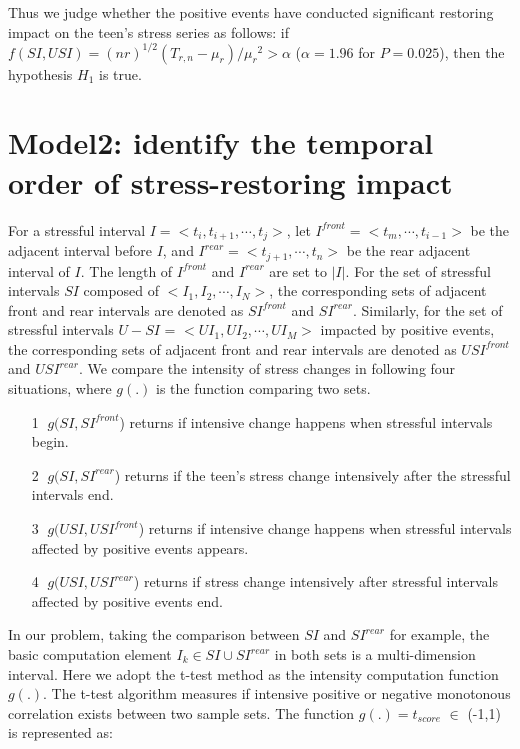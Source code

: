 Thus we judge whether the positive events have conducted significant restoring impact on the teen's stress series as follows:
if $f(SI,USI)=(nr)^{1/2}(T_{r,n}-\mu_{r})/{\mu_r}^2>\alpha$ ($\alpha = 1.96$ for $P=0.025$),
then the hypothesis $H_1$ is true.

\section{Model2: identify the temporal order of stress-restoring impact}
\label{mod:mod2}
For a stressful interval $I = <t_i,t_{i+1},\cdots,t_j>$,
let $I^{front} = <t_m,\cdots,t_{i-1}>$ be the adjacent interval before $I$,
and $I^{rear} = <t_{j+1},\cdots,t_n>$ be the rear adjacent interval of $I$.
The length of $I^{front}$ and $I^{rear}$ are set to $|I|$.
For the set of stressful intervals $SI$ composed of $<I_1,I_2,\cdots,I_N>$,
the corresponding sets of adjacent front and rear intervals are denoted as $SI^{front}$ and $SI^{rear}$.
Similarly, for the set of stressful intervals $U-SI$ = $<UI_1,UI_2,\cdots, UI_M>$ impacted by positive events,
the corresponding sets of adjacent front and rear intervals are denoted as $USI^{front}$ and $USI^{rear}$.
We compare the intensity of stress changes in following four situations,
where $g(.)$ is the function comparing two sets.

\begin{itemize}
\item[\textcircled{1}] $g(SI,SI^{front}$) returns if intensive change happens when stressful intervals begin.
\item[\textcircled{2}] $g(SI,SI^{rear}$) returns if the teen's stress change intensively after the stressful intervals end.
\item[\textcircled{3}] $g(USI,USI^{front}$) returns if intensive change happens when stressful intervals affected by positive events appears.
\item[\textcircled{4}] $g(USI,USI^{rear}$) returns if stress change intensively after stressful intervals affected by positive events end.
\end{itemize}

In our problem, taking the comparison between $SI$ and $SI^{rear}$ for example,
the basic computation element $I_k \in SI \cup SI^{rear}$ in both sets is a multi-dimension interval.
Here we adopt the t-test method as the intensity computation function $g(.)$.
The t-test algorithm measures if intensive positive or negative monotonous correlation
exists between two sample sets.
The function $g(.) = t_{score}$ $\in$ (-1,1) is represented as:

